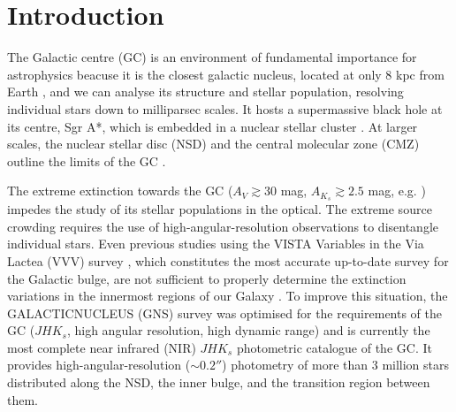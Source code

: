 \documentclass{aa}
\begin{document}
   \maketitle
%



    
    
 
 \section{Introduction}
 
 
The Galactic centre (GC) is an environment of fundamental importance for astrophysics beacuse it is the closest galactic nucleus, located at only 8 kpc from Earth \citep[e.g.][]{Gravity-Collaboration:2018aa,Do:2019aa}, and we can analyse its structure and stellar population, resolving individual stars down to milliparsec scales. It hosts a supermassive black hole at its centre, Sgr A*, which is embedded in a nuclear stellar cluster \citep[e.g.][]{Ghez:1998ad,Schodel:2002zt,Genzel:2010fk,Schodel:2014fk}. At larger scales, the nuclear stellar disc (NSD) and the central molecular zone (CMZ) outline the limits of the GC \citep[e.g.][]{Morris:1996vn,Launhardt:2002nx,Kruijssen:2014aa,Nogueras-Lara:2019ad}.

The extreme extinction towards the GC ($A_V\gtrsim30$ mag, $A_{K_s}\gtrsim2.5$ mag, e.g. \citealt{Nishiyama:2008qa,Schodel:2010fk,Nogueras-Lara:2018aa,Nogueras-Lara:2020aa}) impedes the study of its stellar populations in the optical. The extreme source crowding requires the use of high-angular-resolution observations to disentangle individual stars. Even previous studies using the VISTA Variables in the Via Lactea (VVV) survey \citep{Minniti:2010fk,Saito:2012ml}, which constitutes the most accurate up-to-date survey for the Galactic bulge, are not sufficient to properly determine the extinction variations in the innermost regions of our Galaxy \citep[e.g.][]{Gonzalez:2012aa,Gonzalez:2013aa,Surot:2020vo}. To improve this situation, the GALACTICNUCLEUS (GNS) survey \citep{Nogueras-Lara:2018aa,Nogueras-Lara:2019aa} was optimised for the requirements of the GC ($JHK_s$, high angular resolution, high dynamic range) and is currently the most complete near infrared (NIR) $JHK_s$ photometric catalogue of the GC. It provides high-angular-resolution ($\sim 0.2''$) photometry of more than 3 million stars distributed along the NSD, the inner bulge, and the transition region between them.
\end{document}
